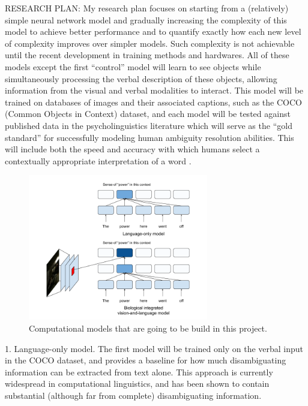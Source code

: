 \documentclass[letterpaper, 12pt]{article}
\begin{document}
RESEARCH PLAN: My research plan focuses on starting from a (relatively) simple neural network model and gradually increasing the complexity of this model to achieve better performance and to quantify exactly how each new level of complexity improves over simpler models. Such complexity is not achievable until the recent development in training methods and hardwares. All of these models except the first ``control'' model will learn to see objects while simultaneously processing the verbal description of these objects, allowing information from the visual and verbal modalities to interact. This model will be trained on databases of images and their associated captions, such as the COCO (Common Objects in Context) dataset, and each model will be tested against published data in the psycholinguistics literature which will serve as the ``gold standard'' for successfully modeling human ambiguity resolution abilities. This will include both the speed and accuracy with which humans select a contextually appropriate interpretation of a word \citep{riceComparisonHomonymMeaning2019}.

\begin{figure}[H]
\begin{center}
\includegraphics[width=0.7\textwidth,keepaspectratio]{model_figure}
\end{center}
    \caption{Computational models that are going to be build in this project.}
\end{figure}

1.  Language-only model. The first model will be trained only on the verbal input in the COCO dataset, and provides a baseline for how much disambiguating information can be extracted from text alone.  This approach is currently widespread in computational linguistics, and has been shown to contain substantial (although far from complete) disambiguating information. \citep{beekhuizenWhatCompanySemantically2018}
\end{document}
